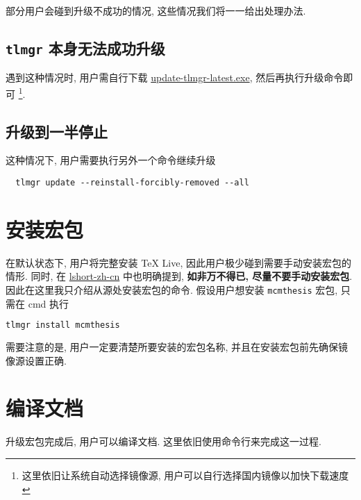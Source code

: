 部分用户会碰到升级不成功的情况, 这些情况我们将一一给出处理办法. 

\subsection{\texttt{tlmgr} 本身无法成功升级}

遇到这种情况时, 用户需自行下载
\href{https://mirrors.ctan.org/systems/texlive/tlnet/update-tlmgr-latest.exe}{update-tlmgr-latest.exe},
然后再执行升级命令即可%
\footnote{这里依旧让系统自动选择镜像源,
用户可以自行选择国内镜像以加快下载速度}. 

\subsection{升级到一半停止}

这种情况下, 用户需要执行另外一个命令继续升级
\begin{lstlisting}
  tlmgr update --reinstall-forcibly-removed --all
\end{lstlisting}

\section{安装宏包}

在默认状态下, 用户将完整安装 \TeX{} Live, 因此用户极少碰到需要手动安装宏包的情形. 
同时, 在
\href{http://mirrors.ctan.org/info/lshort/chinese/lshort-zh-cn.pdf}{lshort-zh-cn}
中也明确提到, \textbf{如非万不得已, 尽量不要手动安装宏包}. 
因此在这里我只介绍从源处安装宏包的命令. 
假设用户想安装 \texttt{mcmthesis} 宏包, 只需在 \textsf{cmd} 执行
\begin{lstlisting}[language=bash]
  tlmgr install mcmthesis
\end{lstlisting}
需要注意的是, 用户一定要清楚所要安装的宏包名称, 并且在安装宏包前先确保镜像源设置正确. 

\section{编译文档}\label{sec:windows:compile}

升级宏包完成后, 用户可以编译文档. 
这里依旧使用命令行来完成这一过程. 

